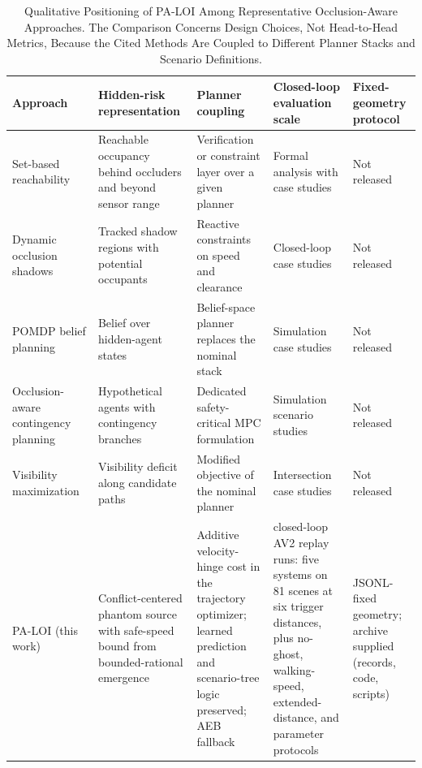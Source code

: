\begin{table}[!ht]
\caption{Qualitative Positioning of PA-LOI Among Representative Occlusion-Aware Approaches. The Comparison Concerns Design Choices, Not Head-to-Head Metrics, Because the Cited Methods Are Coupled to Different Planner Stacks and Scenario Definitions.}
\label{tab:related-comparison}
\centering
\scriptsize
\setlength{\tabcolsep}{4pt}
\begin{tabular}{>{\raggedright\arraybackslash}p{}>{\raggedright\arraybackslash}p{}>{\raggedright\arraybackslash}p{}>{\raggedright\arraybackslash}p{}>{\raggedright\arraybackslash}p{}}
\toprule
Approach & Hidden-risk representation & Planner coupling & Closed-loop evaluation scale & Fixed-geometry protocol \\
\midrule
Set-based reachability~\cite{orzechowski2018tackling,koschi2021setbased} & Reachable occupancy behind occluders and beyond sensor range & Verification or constraint layer over a given planner & Formal analysis with case studies & Not released \\
Dynamic occlusion shadows~\cite{nager2019shadows} & Tracked shadow regions with potential occupants & Reactive constraints on speed and clearance & Closed-loop case studies & Not released \\
POMDP belief planning~\cite{zhang2021pomdp} & Belief over hidden-agent states & Belief-space planner replaces the nominal stack & Simulation case studies & Not released \\
Occlusion-aware contingency planning~\cite{zheng2026occlusioncontingency} & Hypothetical agents with contingency branches & Dedicated safety-critical MPC formulation & Simulation scenario studies & Not released \\
Visibility maximization~\cite{narksri2022visibility} & Visibility deficit along candidate paths & Modified objective of the nominal planner & Intersection case studies & Not released \\
\midrule
PA-LOI (this work) & Conflict-centered phantom source with safe-speed bound from bounded-rational emergence & Additive velocity-hinge cost in the trajectory optimizer; learned prediction and scenario-tree logic preserved; AEB fallback & 4050 closed-loop AV2 replay runs: five systems on 81 scenes at six trigger distances, plus no-ghost, walking-speed, extended-distance, and parameter protocols & JSONL-fixed geometry; archive supplied (records, code, scripts) \\
\bottomrule
\end{tabular}
\end{table}

